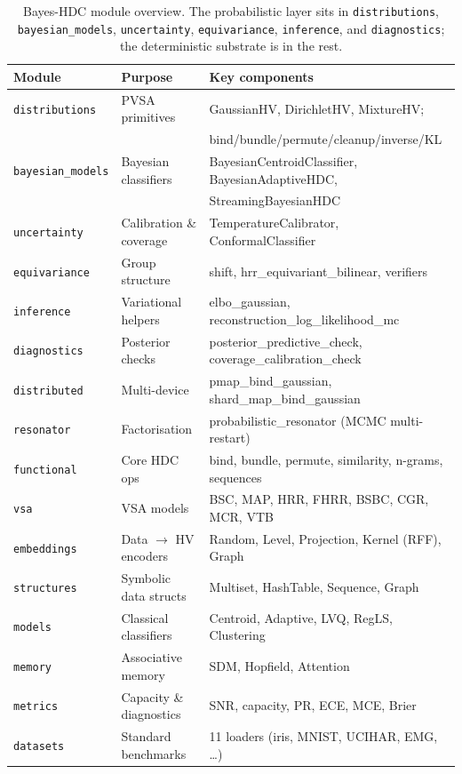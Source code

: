 \documentclass[twoside,11pt]{article}
\begin{document}
\begin{table}[t]
\centering
\caption{Bayes-HDC module overview. The probabilistic layer sits in \texttt{distributions}, \texttt{bayesian\_models}, \texttt{uncertainty}, \texttt{equivariance}, \texttt{inference}, and \texttt{diagnostics}; the deterministic substrate is in the rest.}
\label{tab:modules}
\small
\begin{tabular}{lll}
\toprule
\textbf{Module} & \textbf{Purpose} & \textbf{Key components} \\
\midrule
\texttt{distributions} & PVSA primitives & GaussianHV, DirichletHV, MixtureHV; \\
 & & bind/bundle/permute/cleanup/inverse/KL \\
\texttt{bayesian\_models} & Bayesian classifiers & BayesianCentroidClassifier, BayesianAdaptiveHDC, \\
 & & StreamingBayesianHDC \\
\texttt{uncertainty} & Calibration \& coverage & TemperatureCalibrator, ConformalClassifier \\
\texttt{equivariance} & Group structure & shift, hrr\_equivariant\_bilinear, verifiers \\
\texttt{inference} & Variational helpers & elbo\_gaussian, reconstruction\_log\_likelihood\_mc \\
\texttt{diagnostics} & Posterior checks & posterior\_predictive\_check, coverage\_calibration\_check \\
\texttt{distributed} & Multi-device & pmap\_bind\_gaussian, shard\_map\_bind\_gaussian \\
\texttt{resonator} & Factorisation & probabilistic\_resonator (MCMC multi-restart) \\
\midrule
\texttt{functional} & Core HDC ops & bind, bundle, permute, similarity, n-grams, sequences \\
\texttt{vsa} & VSA models & BSC, MAP, HRR, FHRR, BSBC, CGR, MCR, VTB \\
\texttt{embeddings} & Data $\to$ HV encoders & Random, Level, Projection, Kernel (RFF), Graph \\
\texttt{structures} & Symbolic data structs & Multiset, HashTable, Sequence, Graph \\
\texttt{models} & Classical classifiers & Centroid, Adaptive, LVQ, RegLS, Clustering \\
\texttt{memory} & Associative memory & SDM, Hopfield, Attention \\
\texttt{metrics} & Capacity \& diagnostics & SNR, capacity, PR, ECE, MCE, Brier \\
\texttt{datasets} & Standard benchmarks & 11 loaders (iris, MNIST, UCIHAR, EMG, \ldots) \\
\bottomrule
\end{tabular}
\end{table}
\end{document}
